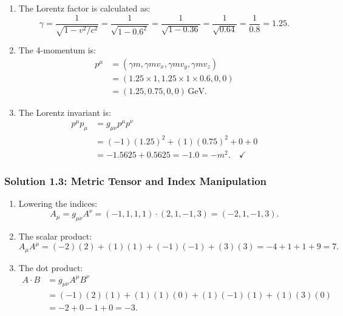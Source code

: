 \begin{enumerate}[label=(\alph*)]
  \item The Lorentz factor is calculated as:
  \[
    \gamma = \frac{1}{\sqrt{1 - v^2/c^2}} = \frac{1}{\sqrt{1 - 0.6^2}} = \frac{1}{\sqrt{1 - 0.36}} = \frac{1}{\sqrt{0.64}} = \frac{1}{0.8} = 1.25.
  \]
  
  \item The 4-momentum is:
  \[
    \begin{aligned}
      p^\mu &= (\gamma m, \gamma m v_x, \gamma m v_y, \gamma m v_z) \\
           &= (1.25 \times 1, 1.25 \times 1 \times 0.6, 0, 0) \\
           &= (1.25, 0.75, 0, 0) \, \text{GeV}.
    \end{aligned}
  \]
  
  \item The Lorentz invariant is:
  \[
    \begin{aligned}
      p^\mu p_\mu &= g_{\mu\nu} p^\mu p^\nu \\
                   &= (-1)(1.25)^2 + (1)(0.75)^2 + 0 + 0 \\
                   &= -1.5625 + 0.5625 = -1.0 = -m^2. \quad \checkmark
    \end{aligned}
  \]
\end{enumerate}

\subsubsection*{Solution 1.3: Metric Tensor and Index Manipulation}

\begin{enumerate}[label=(\alph*)]
  \item Lowering the indices:
  \[
    A_\mu = g_{\mu\nu} A^\nu = (-1, 1, 1, 1) \cdot (2, 1, -1, 3) = (-2, 1, -1, 3).
  \]
  
  \item The scalar product:
  \[
    A_\mu A^\mu = (-2)(2) + (1)(1) + (-1)(-1) + (3)(3) = -4 + 1 + 1 + 9 = 7.
  \]
  
  \item The dot product:
  \[
    \begin{aligned}
      A \cdot B &= g_{\mu\nu} A^\mu B^\nu \\
                 &= (-1)(2)(1) + (1)(1)(0) + (1)(-1)(1) + (1)(3)(0) \\
                 &= -2 + 0 - 1 + 0 = -3.
    \end{aligned}
  \]
\end{enumerate}

